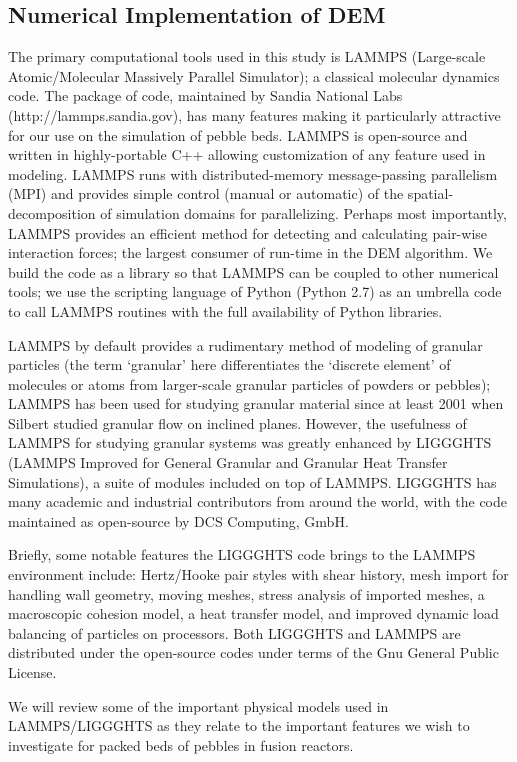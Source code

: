 \subsection{Numerical Implementation of DEM}\label{sec:dem-solver}


The primary computational tools used in this study is LAMMPS (Large-scale Atomic/Molecular Massively Parallel Simulator)\cite{Plimpton1995}; a classical molecular dynamics code. The package of code, maintained by Sandia National Labs (http://lammps.sandia.gov), has many features making it particularly attractive for our use on the simulation of pebble beds. LAMMPS is open-source and written in highly-portable C++ allowing customization of any feature used in modeling. LAMMPS runs with distributed-memory message-passing parallelism (MPI) and provides simple control (manual or automatic) of the spatial-decomposition of simulation domains for parallelizing. Perhaps most importantly, LAMMPS provides an efficient method for detecting and calculating pair-wise interaction forces; the largest consumer of run-time in the DEM algorithm\cite{Plimpton1995}. We build the code as a library so that LAMMPS can be coupled to other numerical tools; we use the scripting language of Python (Python 2.7) as an umbrella code to call LAMMPS routines with the full availability of Python libraries. 

LAMMPS by default provides a rudimentary method of modeling of granular particles (the term `granular' here differentiates the `discrete element' of molecules or atoms from larger-scale granular particles of powders or pebbles); LAMMPS has been used for studying granular material since at least 2001 when Silbert\etal\cite{Silbert2001} studied granular flow on inclined planes. However, the usefulness of LAMMPS for studying granular systems was greatly enhanced by LIGGGHTS (LAMMPS Improved for General Granular and Granular Heat Transfer Simulations), a suite of modules included on top of LAMMPS. LIGGGHTS has many academic and industrial contributors from around the world, with the code maintained as open-source by DCS Computing, GmbH.

Briefly, some notable features the LIGGGHTS code brings to the LAMMPS environment include: Hertz/Hooke pair styles with shear history, mesh import for handling wall geometry, moving meshes, stress analysis of imported meshes, a macroscopic cohesion model, a heat transfer model, and improved dynamic load balancing of particles on processors\cite{Kloss2011,Kloss2012}. Both LIGGGHTS and LAMMPS are distributed under the open-source codes under terms of the Gnu General Public License.

We will review some of the important physical models used in LAMMPS/LIGGGHTS as they relate to the important features we wish to investigate for packed beds of pebbles in fusion reactors.


